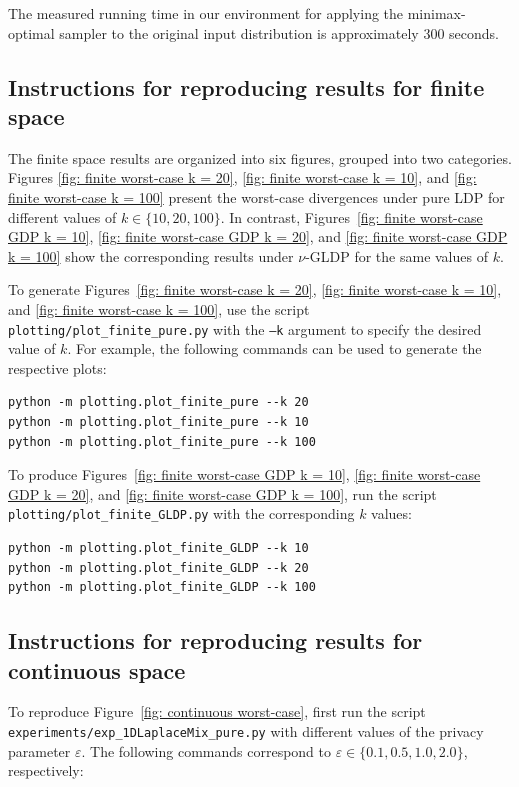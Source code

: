 \documentclass[accepted]{article}
\theoremstyle{plain} %
\theoremstyle{definition}
\theoremstyle{remark}
\newcommand{\eps}{\varepsilon}
\begin{document}
The measured running time in our environment for applying the minimax-optimal sampler to the original input distribution is approximately 300 seconds.

\subsection{Instructions for reproducing results for finite space}

The finite space results are organized into six figures, grouped into two categories. 
Figures \ref{fig: finite worst-case k = 20}, \ref{fig: finite worst-case k = 10}, and \ref{fig: finite worst-case k = 100} 
present the worst-case divergences under pure LDP for different values of \( k \in \{10, 20, 100\} \). 
In contrast, Figures~\ref{fig: finite worst-case GDP k = 10}, \ref{fig: finite worst-case GDP k = 20}, 
and \ref{fig: finite worst-case GDP k = 100} show the corresponding results under \( \nu \)-GLDP for the same values of \( k \).

To generate Figures~\ref{fig: finite worst-case k = 20}, \ref{fig: finite worst-case k = 10}, and \ref{fig: finite worst-case k = 100}, 
use the script \texttt{plotting/plot\_finite\_pure.py} with the \texttt{--k} argument to specify the desired value of \( k \). 
For example, the following commands can be used to generate the respective plots:
\begin{verbatim}
python -m plotting.plot_finite_pure --k 20
python -m plotting.plot_finite_pure --k 10
python -m plotting.plot_finite_pure --k 100
\end{verbatim}

To produce Figures~\ref{fig: finite worst-case GDP k = 10}, \ref{fig: finite worst-case GDP k = 20}, 
and \ref{fig: finite worst-case GDP k = 100}, run the script \texttt{plotting/plot\_finite\_GLDP.py} with the corresponding \( k \) values:
\begin{verbatim}
python -m plotting.plot_finite_GLDP --k 10
python -m plotting.plot_finite_GLDP --k 20
python -m plotting.plot_finite_GLDP --k 100
\end{verbatim}



\subsection{Instructions for reproducing results for continuous space}

To reproduce Figure~\ref{fig: continuous worst-case}, first run the script \texttt{experiments/exp\_1DLaplaceMix\_pure.py} with different values of the privacy parameter \( \eps \). The following commands correspond to \( \eps \in \{0.1, 0.5, 1.0, 2.0\} \), respectively:
\end{document}

